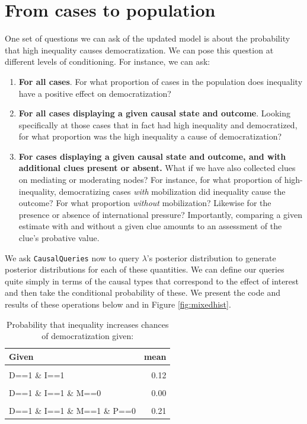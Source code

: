 \documentclass[
  12pt,
]{book}
\begin{document}
\hypertarget{from-cases-to-population}{%
\section{From cases to population}\label{from-cases-to-population}}

One set of questions we can ask of the updated model is about the probability that high inequality causes democratization. We can pose this question at different levels of conditioning. For instance, we can ask:

\begin{enumerate}
\def\labelenumi{\arabic{enumi}.}
\item
  \textbf{For all cases}. For what proportion of cases in the population does inequality have a positive effect on democratization?
\item
  \textbf{For all cases displaying a given causal state and outcome}. Looking specifically at those cases that in fact had high inequality and democratized, for what proportion was the high inequality a cause of democratization?
\item
  \textbf{For cases displaying a given causal state and outcome, and with additional clues present or absent.} What if we have also collected clues on mediating or moderating nodes? For instance, for what proportion of high-inequality, democratizing cases \emph{with} mobilization did inequality cause the outcome? For what proportion \emph{without} mobilization? Likewise for the presence or absence of international pressure? Importantly, comparing a given estimate with and without a given clue amounts to an assessment of the clue's probative value.
\end{enumerate}

We ask \texttt{CausalQueries} now to query \(\lambda\)'s posterior distribution to generate posterior distributions for each of these quantities. We can define our queries quite simply in terms of the causal types that correspond to the effect of interest and then take the conditional probability of these. We present the code and results of these operations below and in Figure \ref{fig:mixedhist}.

\begin{table}

\caption{\label{tab:unnamed-chunk-22}Probability that inequality increases chances of democratization given:}
\centering
\begin{tabular}[t]{lr}
\toprule
Given & mean\\
\midrule
\cellcolor{gray!6}{-} & \cellcolor{gray!6}{0.04}\\
D==1 \& I==1 & 0.12\\
\cellcolor{gray!6}{D==1 \& I==1 \& M==1} & \cellcolor{gray!6}{0.16}\\
D==1 \& I==1 \& M==0 & 0.00\\
\cellcolor{gray!6}{D==1 \& I==1 \& M==1 \& P==1} & \cellcolor{gray!6}{0.09}\\
\addlinespace
D==1 \& I==1 \& M==1 \& P==0 & 0.21\\
\bottomrule
\end{tabular}
\end{table}
\end{document}
